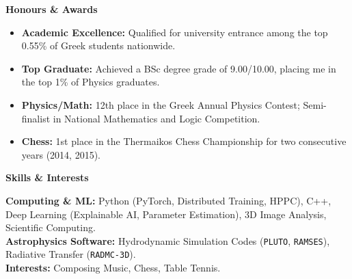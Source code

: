 \documentclass[11pt]{article}
\begin{document}
\begin{center}
    \textbf{Honours \& Awards}
\end{center}
\begin{itemize}[noitemsep, topsep=0pt, partopsep=0pt, parsep=0pt]
    \item \textbf{Academic Excellence:} Qualified for university entrance among the top 0.55\% of Greek students nationwide.
    \item \textbf{Top Graduate:} Achieved a BSc degree grade of 9.00/10.00, placing me in the top 1\% of Physics graduates.
    \item \textbf{Physics/Math:} 12th place in the Greek Annual Physics Contest; Semi-finalist in National Mathematics and Logic Competition.
    \item \textbf{Chess:} 1st place in the Thermaikos Chess Championship for two consecutive years (2014, 2015).
\end{itemize}
\begin{center}
    \textbf{Skills \& Interests}
\end{center}
\textbf{Computing \& ML:} Python (PyTorch, Distributed Training, HPPC), C++, Deep Learning (Explainable AI, Parameter Estimation), 3D Image Analysis, Scientific Computing.\\[4pt]
\textbf{Astrophysics Software:} Hydrodynamic Simulation Codes (\texttt{PLUTO}, \texttt{RAMSES}), Radiative Transfer (\texttt{RADMC-3D}).\\[4pt]
\textbf{Interests:} Composing Music, Chess, Table Tennis.
\end{document}
